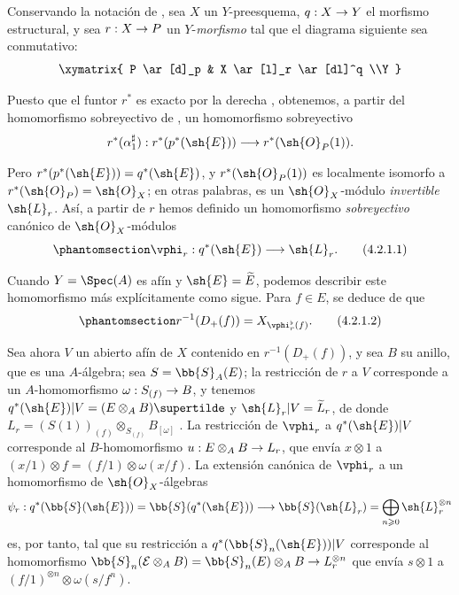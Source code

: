 \documentclass[oneside,10pt]{amsart}
\makeatletter
\renewcommand{\geq}{\geqslant}
\newcommand{\ega@arrow}[2]{\mathchoice{#1}{#2}{#2}{#2}}
\renewcommand{\to}{\ega@arrow{\longrightarrow}{\rightarrow}}
\newcommand{\oldpage}[2][]{\marginnote{\normalfont\footnotesize\textbf{#1}~|~#2}\ignorespaces}
\let\EGAOriginalLabel\label
\renewcommand{\label}[1]{\phantomsection\EGAOriginalLabel{#1}}
\makeatother
\begin{document}
\begin{env}[4.2.1]
\label{II.4.2.1}
Conservando la notación de , sea $X$ un $Y$-preesquema, $q:X\to Y$ el morfismo estructural, y sea $r:X\to P$ un $Y$-\emph{morfismo} tal que el diagrama siguiente sea conmutativo:
\[
  \xymatrix{
    P \ar[d]_p & X \ar[l]_r \ar[dl]^q
  \\Y
  }
\]
\oldpage[II]{73}

Puesto que el funtor $r^*$ es exacto por la derecha , obtenemos, a partir del homomorfismo sobreyectivo de , un homomorfismo sobreyectivo
\[
  r^*(\alpha_1^\sharp): r^*(p^*(\sh{E})) \to r^*(\sh{O}_P(1)).
\]

Pero $r^*(p^*(\sh{E}))=q^*(\sh{E})$, y $r^*(\sh{O}_P(1))$ es localmente isomorfo a $r^*(\sh{O}_P)=\sh{O}_X$; en otras palabras, es un $\sh{O}_X$-módulo \emph{invertible} $\sh{L}_r$.
Así, a partir de $r$ hemos definido un homomorfismo \emph{sobreyectivo} canónico de $\sh{O}_X$-módulos
\[
\label{II.4.2.1.1}
  \vphi_r:q^*(\sh{E}) \to \sh{L}_r.
  \tag{4.2.1.1}
\]

Cuando $Y=\Spec(A)$ es afín y $\sh{E}=\widetilde{E}$, podemos describir este homomorfismo más explícitamente como sigue.
Para $f\in E$, se deduce de  que
\[
\label{II.4.2.1.2}
  r^{-1}(D_+(f)) = X_{\vphi_r^\flat(f)}.
  \tag{4.2.1.2}
\]

Sea ahora $V$ un abierto afín de $X$ contenido en $r^{-1}(D_+(f))$, y sea $B$ su anillo, que es una $A$-álgebra;
sea $S=\bb{S}_A(E)$;
la restricción de $r$ a $V$ corresponde a un $A$-homomorfismo $\omega:S_{(f)}\to B$, y tenemos $q^*(\sh{E})|V=(E\otimes_A B)\supertilde$ y $\sh{L}_r|V=\widetilde L_r$, de donde $L_r=(S(1))_{(f)}\otimes_{S_{(f)}}B_{[\omega]}$ .
La restricción de $\vphi_r$ a $q^*(\sh{E})|V$ corresponde al $B$-homomorfismo $u:E\otimes_A B\to L_r$, que envía $x\otimes1$ a $(x/1)\otimes f=(f/1)\otimes\omega(x/f)$.
La extensión canónica de $\vphi_r$ a un homomorfismo de $\sh{O}_X$-álgebras
\[
  \psi_r:q^*(\bb{S}(\sh{E}))=\bb{S}(q^*(\sh{E}))\to\bb{S}(\sh{L}_r)=\bigoplus_{n\geq0}\sh{L}_r^{\otimes n}
\]
es, por tanto, tal que su restricción a $q^*(\bb{S}_n(\sh{E}))|V$ corresponde al homomorfismo
$\bb{S}_n(\mathcal E\otimes_A B)=\bb{S}_n(E)\otimes_A B\to L_r^{\otimes n}$ que envía $s\otimes1$ a $(f/1)^{\otimes n}\otimes\omega(s/f^n)$.
\end{env}
\end{document}
